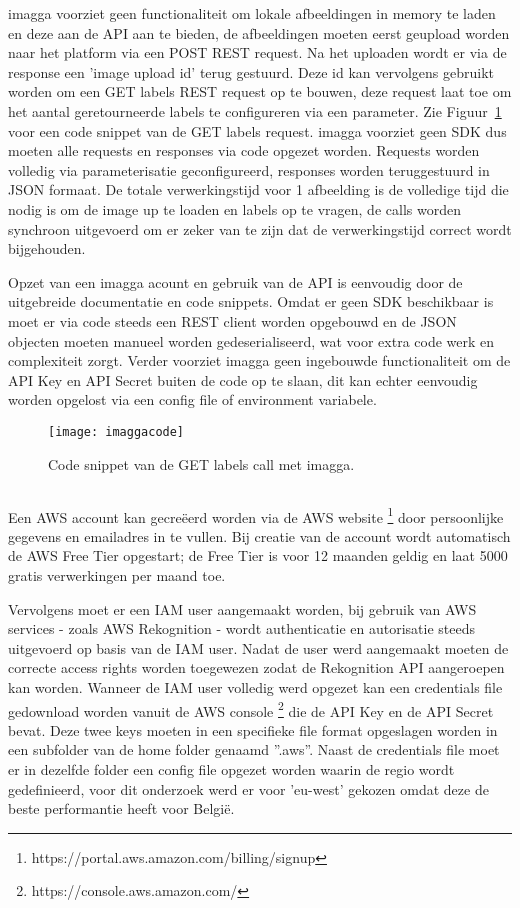 imagga voorziet geen functionaliteit om lokale afbeeldingen in memory te laden en deze aan de API aan te bieden, de afbeeldingen moeten eerst geupload worden naar het platform via een POST REST request. Na het uploaden wordt er via de response een 'image upload id' terug gestuurd. Deze id kan vervolgens gebruikt worden om een GET labels REST request op te bouwen, deze request laat toe om het aantal geretourneerde labels te configureren via een parameter. Zie Figuur~\ref{fig:imaggacode} voor een code snippet van de GET labels request. imagga voorziet geen SDK dus moeten alle requests en responses via code opgezet worden. Requests worden volledig via parameterisatie geconfigureerd, responses worden teruggestuurd in JSON formaat. De totale verwerkingstijd voor 1 afbeelding is de volledige tijd die nodig is om de image up te loaden en labels op te vragen, de calls worden synchroon uitgevoerd om er zeker van te zijn dat de verwerkingstijd correct wordt bijgehouden.

Opzet van een imagga acount en gebruik van de API is eenvoudig door de uitgebreide documentatie en code snippets. Omdat er geen SDK beschikbaar is moet er via code steeds een REST client worden opgebouwd en de JSON objecten moeten manueel worden gedeserialiseerd, wat voor extra code werk en complexiteit zorgt. Verder voorziet imagga geen ingebouwde functionaliteit om de API Key en API Secret buiten de code op te slaan, dit kan echter eenvoudig worden opgelost via een config file of environment variabele.

\begin{figure}
    \centering
    \texttt{[image: imaggacode]}
    \caption{Code snippet van de GET labels call met imagga.}
    \label{fig:imaggacode}
\end{figure}

\subsection{}
\label{sec:integration-AWS}
Een AWS account kan gecreëerd worden via de AWS website \footnote{https://portal.aws.amazon.com/billing/signup} door persoonlijke gegevens en emailadres in te vullen. Bij creatie van de account wordt automatisch de AWS Free Tier opgestart; de Free Tier is voor 12 maanden geldig en laat 5000 gratis verwerkingen per maand toe.

Vervolgens moet er een IAM user aangemaakt worden, bij gebruik van AWS services - zoals AWS Rekognition - wordt authenticatie en autorisatie steeds uitgevoerd op basis van de IAM user. Nadat de user werd aangemaakt moeten de correcte access rights worden toegewezen zodat de Rekognition API aangeroepen kan worden. Wanneer de IAM user volledig werd opgezet kan een credentials file gedownload worden vanuit de AWS console \footnote{https://console.aws.amazon.com/} die de API Key en de API Secret bevat. Deze twee keys moeten in een specifieke file format opgeslagen worden in een subfolder van de home folder genaamd ''.aws''. Naast de credentials file moet er in dezelfde folder een config file opgezet worden waarin de regio wordt gedefinieerd, voor dit onderzoek werd er voor 'eu-west' gekozen omdat deze de beste performantie heeft voor België.

